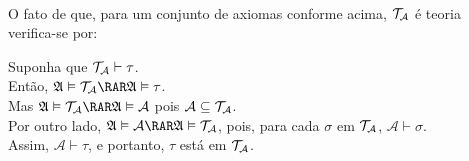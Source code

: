         \paragraph{}
            O fato de que, para um conjunto de axiomas conforme acima, $\mathcal{T}_{\mathcal{A}}$ é teoria
            verifica-se por:
        \begin{proof*}
            Suponha que $\mathcal{T}_{\mathcal{A}}\vdash\tau$.
            \\Então, $\mathfrak{A}\vDash\theoryof{\mathcal{A}}\RAR\mathfrak{A}\vDash\tau$.\\
            Mas $\mathfrak{A}\vDash\theoryof{\mathcal{A}}\RAR\mathfrak{A}\vDash\mathcal{A}$ pois
            $\mathcal{A}\subseteq\mathcal{T}_{\mathcal{A}}$.\\
            Por outro lado, $\mathfrak{A}\vDash\mathcal{A}\RAR\mathfrak{A}\vDash\theoryof{\mathcal{A}}$,
            pois, para cada $\sigma$ em $\mathcal{T}_{\mathcal{A}}$, $\mathcal{A}\vdash\sigma$.\\
            Assim, $\mathcal{A}\vdash\tau$, e portanto, $\tau$ está em $\mathcal{T}_{\mathcal{A}}$.
        \end{proof*}
